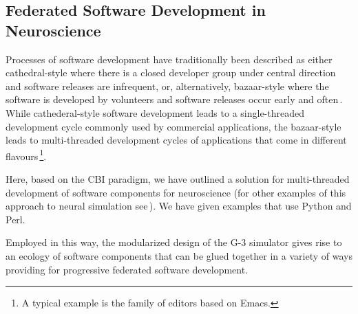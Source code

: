 \documentclass[12pt]{article}
\begin{document}
\subsection{Federated Software Development in Neuroscience}

Processes of software development have traditionally been described as
either cathedral-style where there is a closed developer group under
central direction and software releases are infrequent, or,
alternatively, bazaar-style where the software is developed by
volunteers and software releases occur early and
often\,\cite{raymond01:_cathed_bazaar, citeulike:126678}.
While cathederal-style software development leads to a single-threaded
development cycle commonly used by commercial applications, the
bazaar-style leads to multi-threaded development cycles of
applications that come in different flavours\,\footnote{A typical
  example is the family of editors based on Emacs.}.

Here, based on the CBI paradigm, we have outlined a solution for
multi-threaded development of software components for neuroscience
(for other examples of this approach to neural simulation
see\,\cite{schuermann09:_neuron, nordlie09:_visual}).  We have given
examples that use Python and Perl.

Employed in this way, the modularized design of the G-3 simulator
gives rise to an ecology of software components that can be glued
together in a variety of ways providing for progressive federated
software development.






\end{document}
